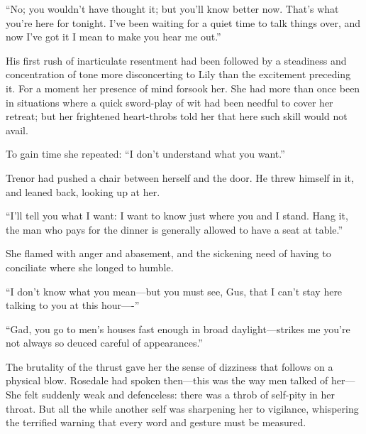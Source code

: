 \documentclass[12pt,a4paper]{book}
\begin{document}
``No; you wouldn't have thought it; but you'll know better
now. That's what you're here for tonight. I've been waiting for a
quiet time to talk things over, and now I've got it I mean to
make you hear me out.''





His first rush of inarticulate resentment had been followed by a
steadiness and concentration of tone more disconcerting to Lily
than the excitement preceding it. For a moment her presence of
mind forsook her. She had more than once been in situations where
a quick sword-play of wit had been needful to cover her retreat;
but her frightened heart-throbs told her that here such skill
would not avail.





To gain time she repeated: ``I don't understand what you want.''





Trenor had pushed a chair between herself and the door. He threw
himself in it, and leaned back, looking up at her.





``I'll tell you what I want: I want to know just where you and I
stand. Hang it, the man who pays for the dinner is generally
allowed to have a seat at table.''





She flamed with anger and abasement, and the sickening need of
having to conciliate where she longed to humble.





``I don't know what you mean---but you must see, Gus, that I can't
stay here talking to you at this hour----''





``Gad, you go to men's houses fast enough in broad 
daylight---strikes me you're not always so deuced careful of
appearances.''





The brutality of the thrust gave her the sense of dizziness that
follows on a physical blow. Rosedale had spoken then---this was
the way men talked of her---She felt suddenly weak and
defenceless: there was a throb of self-pity in her throat. But
all the while another self was sharpening her to vigilance,
whispering the terrified warning that every word and gesture must
be measured.
\end{document}
